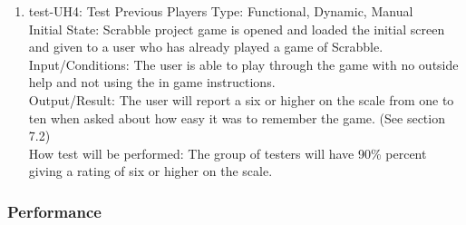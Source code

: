 \documentclass[12pt, titlepage]{article}
\begin{document}
\begin{enumerate}
    \item{test-UH4: Test Previous Players}
    Type: Functional, Dynamic, Manual\\
    Initial State: Scrabble project game is opened and loaded the initial screen and given to a user who has already played a game of Scrabble.\\
    Input/Conditions: The user is able to play through the game with no outside help and not using the in game instructions.\\
    Output/Result:  The user will report a six or higher on the scale from one to ten when asked about how easy it was to remember the game. (See section 7.2)\\
    How test will be performed: The group of testers will have 90\% percent giving a rating of six or higher on the scale.\\
\end{enumerate}

\subsubsection{Performance}
\end{document}
